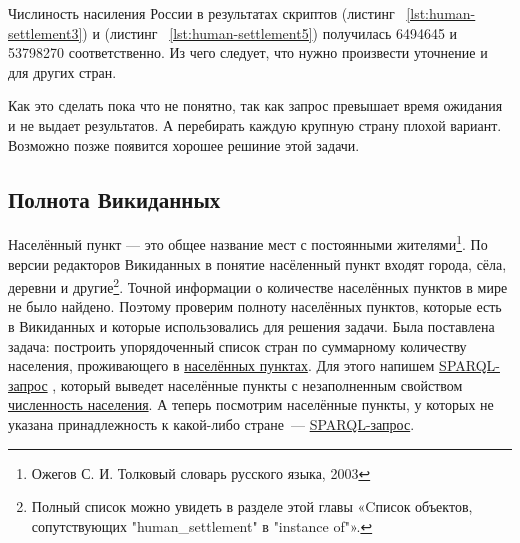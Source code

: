 Числиность насиления России в результатах скриптов (листинг ~\protect\ref{lst:human-settlement3}) и (листинг ~\protect\ref{lst:human-settlement5}) получилась \num{6494645} и \num{53798270} соответственно. Из чего следует, что нужно произвести уточнение и для других стран.

 Как это сделать пока что не понятно, так как запрос превышает время ожидания и не выдает результатов. А перебирать каждую крупную страну плохой вариант. Возможно позже появится хорошее решиние этой задачи.

\subsection{Полнота Викиданных}

Населённый пункт — это общее название мест с постоянными жителями\footnote {Ожегов С. И. Толковый словарь русского языка, 2003}. По версии редакторов Викиданных в понятие насёленный пункт входят города, сёла, деревни и другие\footnote{Полный список можно увидеть в разделе этой главы «Cписок объектов, сопутствующих "human\_settlement" в "instance of"».}.
Точной информации о количестве населённых пунктов в мире не было найдено. Поэтому проверим полноту населённых пунктов, которые есть в Викиданных и которые использовались для решения задачи. Была поставлена задача: построить упорядоченный список стран по суммарному количеству населения, проживающего в \href{http://www.wikidata.org/entity/Q486972}{населённых пунктах}. Для этого напишем \href{https://w.wiki/4FUz}{SPARQL-запрос} \footnotemark, который выведет населённые пункты с незаполненным свойством \href{http://www.wikidata.org/entity/P1082}{численность населения}. 
А теперь посмотрим населённые пункты, у которых не указана принадлежность к какой-либо стране~--- \href{https://w.wiki/4FV8}{SPARQL-запрос}\footnotemark.


